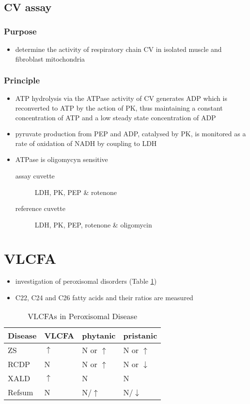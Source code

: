 \documentclass[12pt]{scrartcl}
\begin{document}
\subsection{CV assay}
\label{sec:orgbad4513}
\subsubsection{Purpose}
\label{sec:orgf7b4aaf}
\begin{itemize}
\item determine the activity of respiratory chain CV in isolated
muscle and fibroblast mitochondria
\end{itemize}

\subsubsection{Principle}
\label{sec:org93d8a59}
\begin{itemize}
\item ATP hydrolysis via the ATPase activity of CV generates ADP which is
reconverted to ATP by the action of PK, thus maintaining a constant
concentration of ATP and a low steady state concentration of ADP
\item pyruvate production from PEP and ADP, catalysed by PK, is monitored
as a rate of oxidation of NADH by coupling to LDH
\item ATPase is oligomycyn sensitive
\begin{description}
\item[{assay cuvette}] LDH, PK, PEP \& rotenone
\item[{reference cuvette}] LDH, PK, PEP, rotenone \& oligomycin
\end{description}
\end{itemize}

\section{VLCFA}
\label{sec:org99b41b0}
\begin{itemize}
\item investigation of peroxisomal disorders (Table \ref{tab:org7e793bd})
\item C22, C24 and C26 fatty acids and their ratios are measured
\end{itemize}

\begin{table}[htbp]
\caption{\label{tab:org7e793bd}VLCFAs in Peroxisomal Disease}
\centering
\begin{tabular}{llll}
Disease & VLCFA & phytanic & pristanic\\
\hline
ZS & \(\uparrow\) & N or \(\uparrow\) & N or \(\uparrow\)\\
RCDP & N & N or \(\uparrow\) & N or \(\downarrow\)\\
XALD & \(\uparrow\) & N & N\\
Refsum & N & N/\(\uparrow\) & N/\(\downarrow\)\\
\end{tabular}
\end{table}
\end{document}
